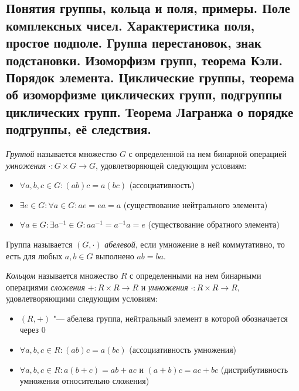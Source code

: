 \subsection{Понятия группы, кольца и поля, примеры. Поле комплексных чисел. Характеристика поля, простое подполе. Группа перестановок, знак подстановки. Изоморфизм групп, теорема Кэли. Порядок элемента. Циклические группы, теорема об изоморфизме циклических групп, подгруппы циклических групп. Теорема Лагранжа о порядке подгруппы, её следствия.}

    \begin{definition}
    	\textit{Группой} называется множество $G$ с определенной на нем бинарной операцией \textit{умножения} $\cdot: G \times G \rightarrow G$, удовлетворяющей следующим условиям:
    	\begin{itemize}
    		\item $\forall a, b, c \in G : (ab)c = a(bc)$ (ассоциативность)
    		\item $\exists e \in G: \forall a \in G: ae = ea = a$ (существование нейтрального элемента)
    		\item $\forall a \in G: \exists a^{-1} \in G: aa^{-1} = a^{-1}a = e$ (существование обратного элемента)
    	\end{itemize}
    \end{definition}
    
    \begin{definition}
    	Группа называется $(G, \cdot)$ \textit{абелевой}, если умножение в ней коммутативно, то есть для любых $a, b \in G$ выполнено $ab = ba$.
    \end{definition}
    
    \begin{definition}
    	\textit{Кольцом} называется множество $R$ с определенными на нем бинарными операциями \textit{сложения} $+ : R \times R \to R$ и \textit{умножения} $\cdot: R \times R \rightarrow R$, удовлетворяющими следующим условиям:
    	\begin{itemize}
    		\item $(R, +)$ "--- абелева группа, нейтральный элемент в которой обозначается через $0$
    		\item $\forall a, b, c \in R: (ab)c = a(bc)$ (ассоциативность умножения)
    		\item $\forall a, b, c \in R: a(b + c) = ab + ac$ и $(a + b)c = ac + bc$ (дистрибутивность умножения относительно сложения)
    	\end{itemize}
    \end{definition}
    
